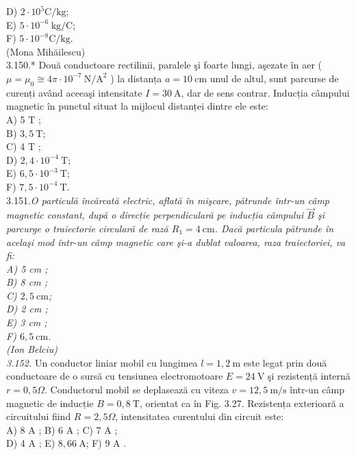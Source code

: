 \documentclass[10pt]{article}
\begin{document}
D) $2 \cdot 10^{5} \mathrm{C} / \mathrm{kg}$;\\
E) $5 \cdot 10^{-6} \mathrm{~kg} / \mathrm{C}$;\\
F) $5 \cdot 10^{-8} \mathrm{C} / \mathrm{kg}$.\\
(Mona Mihăilescu)\\
3.150.* Două conductoare rectilinii, paralele şi foarte lungi, aşezate în aer ( $\mu=\mu_{0} \cong 4 \pi \cdot 10^{-7} \mathrm{~N} / \mathrm{A}^{2}$ ) la distanța $a=10 \mathrm{~cm}$ unul de altul, sunt parcurse de curenți având aceeaşi intensitate $I=30 \mathrm{~A}$, dar de sens contrar. Inducția câmpului magnetic în punctul situat la mijlocul distanței dintre ele este:\\
A) 5 T ;\\
B) $3,5 \mathrm{~T}$;\\
C) 4 T ;\\
D) $2,4 \cdot 10^{-4} \mathrm{~T}$;\\
E) $6,5 \cdot 10^{-3} \mathrm{~T}$;\\
F) $7,5 \cdot 10^{-4} \mathrm{~T}$.\\
3.151.\textit{O particulă încărcată electric, aflată în mişcare, pătrunde într-un câmp magnetic constant, după o direcție perpendiculară pe inducția câmpului $\vec{B}$ şi parcurge o traiectorie circulară de rază $R_{1}=4 \mathrm{~cm}$. Dacă particula pătrunde în acelaşi mod într-un câmp magnetic care şi-a dublat valoarea, raza traiectoriei, va fi:\\
A) 5 cm ;\\
B) 8 cm ;\\
C) $2,5 \mathrm{~cm}$;\\
D) 2 cm ;\\
E) 3 cm ;\\
F) $6,5 \mathrm{~cm}$.\\
(Ion Belciu)\\
3.152.} Un conductor liniar mobil cu lungimea $l=1,2 \mathrm{~m}$ este legat prin două conductoare de o sursă cu tensiunea electromotoare $E=24 \mathrm{~V}$ şi rezistență internă $r=0,5 \Omega$. Conductorul mobil se deplasează cu viteza $v=12,5 \mathrm{~m} / \mathrm{s}$ într-un câmp magnetic de inducție $B=0,8 \mathrm{~T}$, orientat ca în Fig. 3.27. Rezistența exterioară a circuitului fiind $R=2,5 \Omega$, intensitatea curentului din circuit este:\\
A) 8 A ; B) 6 A ; C) 7 A ;\\
D) 4 A ; E) $8,66 \mathrm{~A}$; F) 9 A .\\
\end{document}
